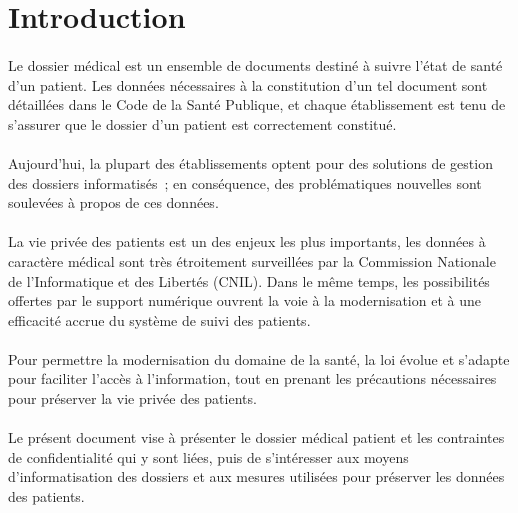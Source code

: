     \section*{Introduction}

\paragraph{}
Le dossier médical est un ensemble de documents destiné à suivre l'état de
santé d'un patient. Les données nécessaires à la constitution d'un tel document
sont détaillées dans le Code de la Santé Publique, et chaque établissement est
tenu de s'assurer que le dossier d'un patient est correctement constitué.

\paragraph{}
Aujourd'hui, la plupart des établissements optent pour des solutions de gestion
des dossiers informatisés~; en conséquence, des problématiques nouvelles sont
soulevées à propos de ces données.

\paragraph{}
La vie privée des patients est un des enjeux les plus importants, les données à
caractère médical sont très étroitement surveillées par la Commission Nationale
de l'Informatique et des Libertés (CNIL). Dans le même temps, les possibilités
offertes par le support numérique ouvrent la voie à la modernisation et à une
efficacité accrue du système de suivi des patients.

\paragraph{}
Pour permettre la modernisation du domaine de la santé, la loi évolue et
s'adapte pour faciliter l'accès à l'information, tout en prenant les
précautions nécessaires pour préserver la vie privée des patients.

\paragraph{}
Le présent document vise à présenter le dossier médical patient et les
contraintes de confidentialité qui y sont liées, puis de s'intéresser aux
moyens d'informatisation des dossiers et aux mesures utilisées pour préserver
les données des patients.
